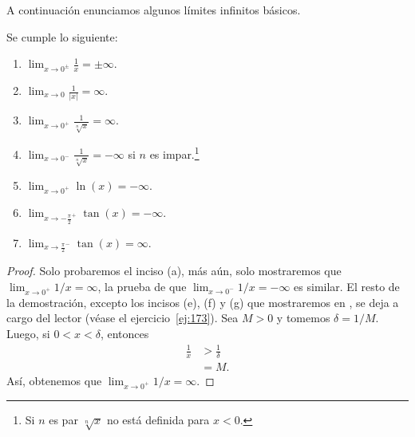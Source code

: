 \documentclass[12pt,a4paper]{book}
\begin{document}
    A continuación enunciamos algunos límites infinitos básicos.

    \begin{proposicion}\label{prop:47}
        Se cumple lo siguiente:
        \begin{enumerate}[nosep]
            \item $\displaystyle\lim_{x\to 0^{\pm}}\frac{1}{x}=\pm\infty$.
            \item $\displaystyle\lim_{x\to 0}\frac{1}{|x|}=\infty$.
            \item $\displaystyle\lim_{x\to 0^{+}}\frac{1}{\sqrt[n]{x}}=\infty$.
            \item $\displaystyle\lim_{x\to 0^{-}}\frac{1}{\sqrt[n]{x}}=-\infty$ si $n$ es impar.\footnote{Si $n$ es par $\sqrt[n]{x}$ no está definida para $x<0$.}
            \item $\displaystyle\lim_{x\to 0^{+}}\ln(x)=-\infty$.
            \item $\displaystyle\lim_{x\to-\frac{\pi}{2}^{+}}\tan(x)=-\infty$.
            \item $\displaystyle\lim_{x\to\frac{\pi}{2}^{-}}\tan(x)=\infty$.
        \end{enumerate}
    \end{proposicion}

    \begin{proof}
        Solo probaremos el inciso (a), más aún, solo mostraremos que
        $\lim_{x\to 0^{+}}1/x=\infty$, la prueba de que $\lim_{x\to 0^{-}}1/x=-\infty$ es similar. El resto
        de la demostración, excepto los incisos (e), (f) y (g) que mostraremos en \cite{nunez2020calculoII},
        se deja a cargo del lector (véase el ejercicio~\ref{ej:173}). Sea $M>0$ y tomemos
        $\delta=1/M$. Luego, si $0<x<\delta$, entonces
        \begin{align*}
            \frac{1}{x}&>\frac{1}{\delta}\\
            &=M.
        \end{align*}
        Así, obtenemos que $\lim_{x\to 0^{+}}1/x=\infty$.
    \end{proof}
\end{document}
